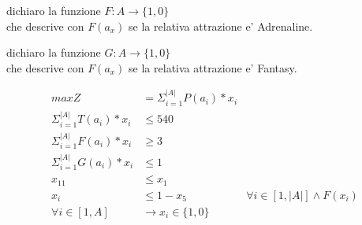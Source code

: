 dichiaro la funzione $F : A \rightarrow \{1,0\}$ \\
che descrive con $F(a_x)$ se la relativa attrazione e' Adrenaline.

dichiaro la funzione $G : A \rightarrow \{1,0\}$ \\
che descrive con $F(a_x)$ se la relativa attrazione e' Fantasy.

\begin{align*}
    max Z &= \Sigma ^ {|A|} _ {i=1} P(a_i) * x_i \\
    \Sigma ^ {|A|} _ {i=1} T(a_i) * x_i &\leq 540 \\
    \Sigma ^ {|A|} _ {i=1} F(a_i) * x_i &\geq 3 \\
    \Sigma ^ {|A|} _ {i=1} G(a_i) * x_i &\leq 1 \\
    x_{11} &\leq x_1 \\
    x_i &\leq 1 - x_5 &\forall i \in [1,|A|] \land F(x_i)\\
    \forall i \in [1,A] &\rightarrow x_i \in \{1,0\}
\end{align*}

